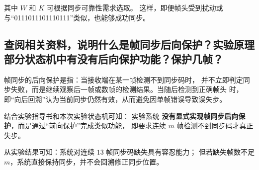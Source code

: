 \documentclass{xjtureport}
\begin{document}
其中 \( W \) 和 \( K \) 可根据同步可靠性需求选取。  
这样，即便帧头受到扰动或与“0111011101110111”类似，也能够成功同步。

\subsection{查阅相关资料，说明什么是帧同步后向保护？实验原理部分状态机中有没有后向保护功能？保护几帧？}

帧同步的后向保护是指：当接收端在某一帧检测不到同步码时，
并不立即判定同步失败，而是继续观察后一帧或数帧的检测结果。当随后检测到正确帧头
时，即“向后回溯”认为当前同步仍然有效，从而避免因单帧错误导致误失步。

结合实验指导书和本次实验状态机可知：  
实验系统 \textbf{没有显式实现帧同步后向保护}，而是通过“前向保护”完成类似功能，
即要求连续 $m$ 帧检测不到同步码才真正失步。

从实验结果可知：系统对连续 \( 13 \) 帧同步码缺失具有容忍能力；  
但若缺失帧数不足 \( m \)，系统直接保持同步，并不会回溯修正同步位置。
\end{document}
